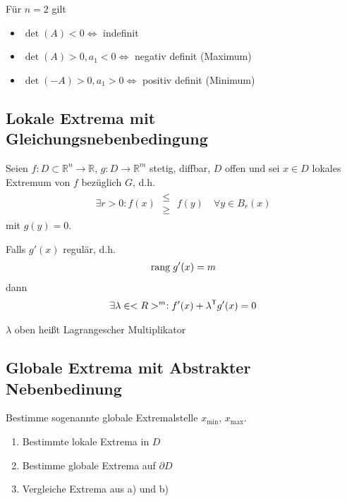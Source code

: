 \begin{boldenvironment}
	Für $n=2$ gilt
	\begin{itemize}
		\item $\det(A)<0\Leftrightarrow$ indefinit
		\item $\det(A)>0, a_1<0\Leftrightarrow$ negativ definit (Maximum)
		\item $\det(-A)>0, a_1>0\Leftrightarrow$ positiv definit (Minimum)
	\end{itemize}
\end{boldenvironment}

\subsection{Lokale Extrema mit Gleichungsnebenbedingung}
\begin{proposition}
	Seien $f:D\subset\mathbb{R}^n\to\mathbb{R}$, $g:D\to\mathbb{R}^m$ stetig, diffbar, $D$ offen und sei $x\in D$ lokales Extremum von $f$ bezüglich $G$, d.h. \begin{align*}\exists r > 0: f(x)\; \substack{\le \\ \ge}\; f(y)\quad\forall y\in B_r(x)\end{align*} mit $g(y) = 0$.
	
	Falls $g'(x)$ regulär, d.h. \begin{align}
	\mathrm{rang}\; g'(x) = m\notag \end{align}dann
	\begin{align}
	\exists \lambda\in<R>^m: f'(x) + \lambda^\mathsf{T} g'(x) = 0\notag\end{align}
\end{proposition}

\begin{*definition}
	$\lambda$ oben heißt Lagrangescher Multiplikator
\end{*definition}

\subsection{Globale Extrema mit Abstrakter Nebenbedinung}
\begin{boldenvironment}[Frage]
	Bestimme sogenannte globale Extremalstelle $x_{\min}$, $x_{\max}$.
\end{boldenvironment}

\begin{boldenvironment}[Strategie]\vspace*{0pt}
	\begin{enumerate}[label={\alph*)},topsep=\dimexpr-\baselineskip/2\relax]
		\item Bestimmte lokale Extrema in $D$
		\item Bestimme globale Extrema auf $\partial D$
		\item Vergleiche Extrema aus a) und b)
	\end{enumerate}
\end{boldenvironment}